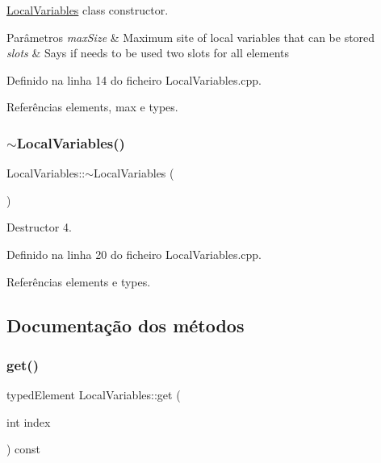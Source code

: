 \hyperlink{classLocalVariables}{Local\+Variables} class constructor. 


\begin{DoxyParams}{Parâmetros}
{\em max\+Size} & Maximum site of local variables that can be stored \\
\hline
{\em slots} & Says if needs to be used two slots for all elements \\
\hline
\end{DoxyParams}


Definido na linha 14 do ficheiro Local\+Variables.\+cpp.



Referências elements, max e types.

\mbox{\label{classLocalVariables_aaf00f6cc3391fdd2cc0ecd2b1d31c887}} 
\subsubsection{\texorpdfstring{$\sim$\+Local\+Variables()}{~LocalVariables()}}
{\footnotesize\ttfamily Local\+Variables\+::$\sim$\+Local\+Variables (\begin{DoxyParamCaption}{ }\end{DoxyParamCaption})}



Destructor 4. 



Definido na linha 20 do ficheiro Local\+Variables.\+cpp.



Referências elements e types.



\subsection{Documentação dos métodos}
\mbox{\label{classLocalVariables_a4abbb4a732d7dd0f11a147b79c15ae10}} 
\subsubsection{\texorpdfstring{get()}{get()}}
{\footnotesize\ttfamily typed\+Element Local\+Variables\+::get (\begin{DoxyParamCaption}\item[{int}]{index }\end{DoxyParamCaption}) const}



